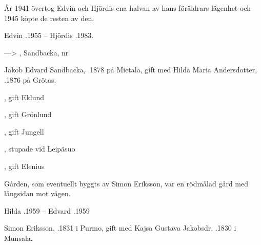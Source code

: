 År 1941 övertog Edvin och Hjördis ena halvan av hans föräldrars lägenhet och 1945 köpte de resten av den.

Edvin .1955  --  Hjördis .1983.


--->	, Sandbacka, nr 

Jakob Edvard Sandbacka, .1878 på Mietala, gift med Hilda Maria Andersdotter, .1876 på Grötas.
\begin{jhchildren}
  \item {}
  \item {}
  \item {}
  \item {}, gift Eklund
  \item {}, gift Grönlund
  \item {}
  \item {}, gift Jungell
  \item {}, stupade vid Leipäsuo
  \item {}, gift Elenius
\end{jhchildren}

Gården, som eventuellt byggts av Simon Eriksson, var en rödmålad gård med långsidan mot vägen.

Hilda .1959  --  Edvard .1959



Simon Eriksson,  .1831 i Purmo, gift med Kajsa Gustava Jakobsdr, .1830 i Munsala.
\begin{jhchildren}
  \item {}
  \item {}
  \item {}
  \item {}
  \item {}
\end{jhchildren}

